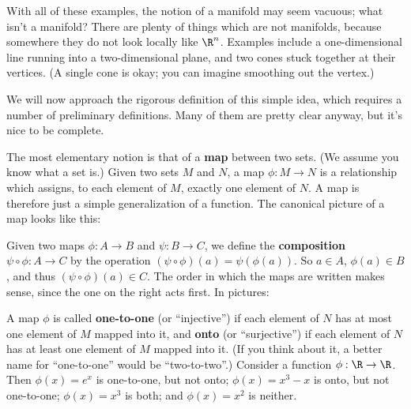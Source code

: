 With all of these examples, the notion of a manifold may seem vacuous;
what isn't a manifold?  There are plenty of things which are not
manifolds, because somewhere they do not look locally like $\R^n$.
Examples include a one-dimensional line running into a two-dimensional
plane, and two cones stuck together at their vertices.  (A single cone
is okay; you can imagine smoothing out the vertex.)

\begin{figure}[h]
  \centerline{
  }
\end{figure}

We will now approach the rigorous definition of this simple idea, which
requires a number of preliminary definitions.  Many of them are pretty
clear anyway, but it's nice to be complete.

The most elementary notion is that of a {\bf map} between two sets.
(We assume you know what a set is.)  Given two sets $M$ and $N$, a
map $\phi: M\rightarrow N$ is a relationship which assigns, to each
element of $M$, exactly one element of $N$.  A map is therefore just a
simple generalization of a function.  The canonical picture of a
map looks like this:

\begin{figure}[h]
  \centerline{
  }
\end{figure}

Given two maps $\phi: A\rightarrow B$ and $\psi:B\rightarrow C$,
we define the {\bf composition} $\psi\circ\phi: A\rightarrow C$
by the operation $(\psi\circ\phi)(a)=\psi(\phi(a))$.  So $a\in A$,
$\phi(a)\in B$, and thus $(\psi\circ\phi)(a)\in C$.  The order in
which the maps are written makes sense, since the one on the right
acts first.  In pictures:

\begin{figure}[h]
  \centerline{
  }
\end{figure}

A map $\phi$ is called {\bf one-to-one} (or ``injective'') if each
element of $N$ has at most one element of $M$ mapped into it, and
{\bf onto} (or ``surjective'') if each element of $N$ has at least one 
element of $M$ mapped into it.  (If you think about it, a better name for
``one-to-one'' would be ``two-to-two''.)  Consider a function
$\phi: \R\rightarrow\R$.  Then $\phi(x)=e^x$ is one-to-one, but not onto;
$\phi(x)=x^3-x$ is onto, but not one-to-one; $\phi(x)=x^3$ is both; and
$\phi(x)=x^2$ is neither.  

